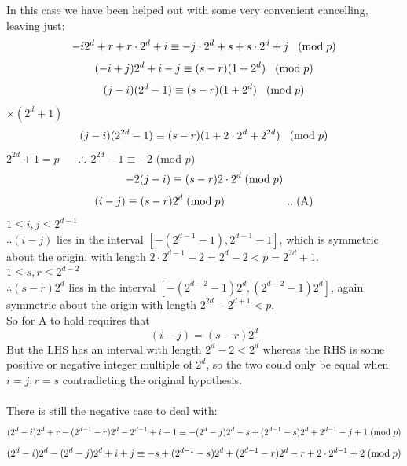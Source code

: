 \documentclass[
  12pt,
  a4paper]{book}
\begin{document}
In this case we have been helped out with some very convenient
cancelling, leaving just:
\[-i2^d+r+r \cdot 2^d + i \equiv -j \cdot 2^d + s + s \cdot 2^d + j \hspace{0.3cm} (\mathrm{mod} \hspace{0.1cm} p)\]
\[(-i+j)2^d + i -j \equiv (s-r)(1+2^d) \hspace{0.3cm} (\mathrm{mod} \hspace{0.1cm} p)\]
\[(j-i)(2^d -1) \equiv (s-r)(1+2^d) \hspace{0.3cm} (\mathrm{mod} \hspace{0.1cm} p)\]
\(\times (2^d+1)\)
\[(j-i)(2^{2d} -1) \equiv (s-r)(1+2 \cdot 2^d + 2^{2d}) \hspace{0.3cm} (\mathrm{mod} \hspace{0.1cm} p)\]
\(2^{2d}+1=p\) \(\hspace{0.5cm}\therefore\) \(2^{2d}-1 \equiv -2\) (mod \(p\))
\[-2(j-i)\equiv (s-r)2 \cdot 2^d \hspace{0.1cm} (\mathrm{mod} \hspace{0.1cm} p)\]
\[(i-j)\equiv (s-r) 2^d \hspace{0.1cm} (\mathrm{mod} \hspace{0.1cm} p) \hspace{2cm} ...(\mathrm{A})\]
\(1 \leq i, j \leq 2^{d-1}\)\\
\(\therefore (i-j)\) lies in the interval \([-(2^{d-1}-1),2^{d-1}-1]\),
which is symmetric about the origin, with length
\(2 \cdot 2^{d-1}-2=2^d-2 < p = 2^{2d}+1\).\\
\(1 \leq s,r \leq 2^{d-2}\)\\
\(\therefore(s-r)2^d\) lies in the interval
\([-(2^{d-2}-1)2^d,(2^{d-2}-1)2^d]\), again symmetric about the origin
with length \(2^{2d}-2^{d+1} < p\).\\
So for A to hold requires that \[(i-j)=(s-r)2^d\] But the LHS has an
interval with length \(2^d-2 < 2^d\) whereas the RHS is some positive or
negative integer multiple of \(2^d\), so the two could only be equal when
\(i=j,r=s\) contradicting the original hypothesis.\\
~\\
There is still the negative case to deal with:
\[(2^d-i)2^d+r-(2^{d-1}-r)2^d-2^{d-1}+i-1 \equiv
-(2^d-j)2^d-s+(2^{d-1}-s)2^d+2^{d-1}-j+1\hspace{0.1cm} (\mathrm{mod} \hspace{0.1cm} p)\]
\[(2^d-i)2^d-(2^{d}-j)2^d+i+j \equiv
-s+(2^{d-1}-s)2^d + (2^{d-1} -r)2^d -r + 2 \cdot 2^{d-1} + 2 \hspace{0.1cm} (\mathrm{mod} \hspace{0.1cm} p)\]
\end{document}

